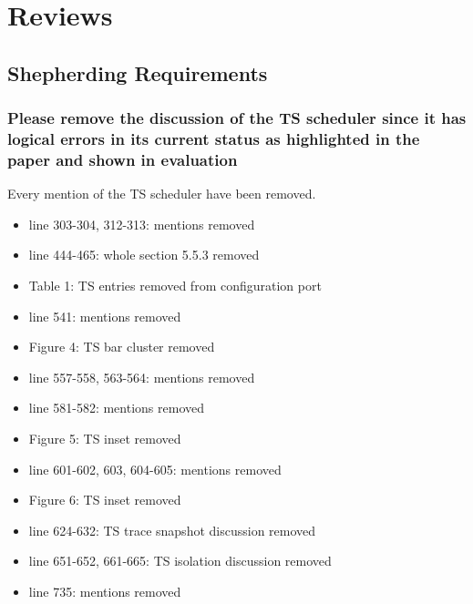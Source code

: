 \newpage
\section{Reviews}

    \subsection{Shepherding Requirements}
        \subsubsection{Please remove the discussion of the TS scheduler since it has logical errors in its current status as highlighted in the paper and shown in evaluation}
            \label{subsubsec:ts_removal}
            Every mention of the TS scheduler have been removed.
            \begin{itemize}
                \item line 303-304, 312-313: mentions removed
                \item line 444-465: whole section 5.5.3 removed
                \item Table 1: TS entries removed from configuration port
                \item line 541: mentions removed
                \item Figure 4: TS bar cluster removed
                \item line 557-558, 563-564: mentions removed
                \item line 581-582: mentions removed
                \item Figure 5: TS inset removed
                \item line 601-602, 603, 604-605: mentions removed
                \item Figure 6: TS inset removed
                \item line 624-632: TS trace snapshot discussion removed
                \item line 651-652, 661-665: TS isolation discussion removed
                \item line 735: mentions removed
            \end{itemize}

